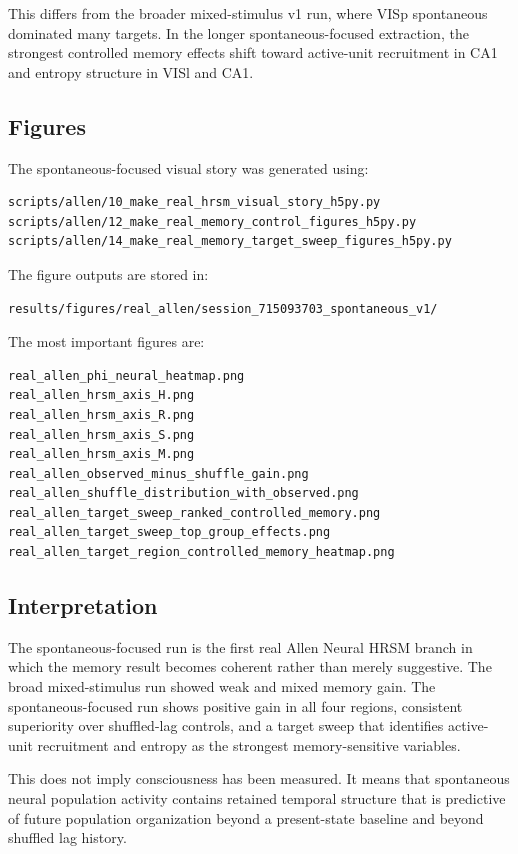 This differs from the broader mixed-stimulus v1 run, where VISp spontaneous dominated many targets. In the longer spontaneous-focused extraction, the strongest controlled memory effects shift toward active-unit recruitment in CA1 and entropy structure in VISl and CA1.

\subsection{Figures}

The spontaneous-focused visual story was generated using:

\begin{verbatim}
scripts/allen/10_make_real_hrsm_visual_story_h5py.py
scripts/allen/12_make_real_memory_control_figures_h5py.py
scripts/allen/14_make_real_memory_target_sweep_figures_h5py.py
\end{verbatim}

The figure outputs are stored in:

\begin{verbatim}
results/figures/real_allen/session_715093703_spontaneous_v1/
\end{verbatim}

The most important figures are:

\begin{verbatim}
real_allen_phi_neural_heatmap.png
real_allen_hrsm_axis_H.png
real_allen_hrsm_axis_R.png
real_allen_hrsm_axis_S.png
real_allen_hrsm_axis_M.png
real_allen_observed_minus_shuffle_gain.png
real_allen_shuffle_distribution_with_observed.png
real_allen_target_sweep_ranked_controlled_memory.png
real_allen_target_sweep_top_group_effects.png
real_allen_target_region_controlled_memory_heatmap.png
\end{verbatim}

\subsection{Interpretation}

The spontaneous-focused run is the first real Allen Neural HRSM branch in which the memory result becomes coherent rather than merely suggestive. The broad mixed-stimulus run showed weak and mixed memory gain. The spontaneous-focused run shows positive gain in all four regions, consistent superiority over shuffled-lag controls, and a target sweep that identifies active-unit recruitment and entropy as the strongest memory-sensitive variables.

This does not imply consciousness has been measured. It means that spontaneous neural population activity contains retained temporal structure that is predictive of future population organization beyond a present-state baseline and beyond shuffled lag history.

